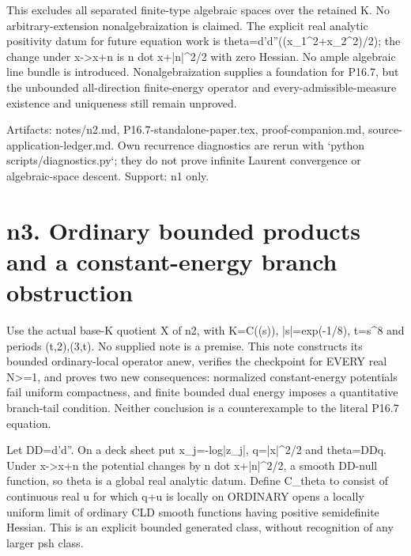 \documentclass[11pt]{article}
\begin{document}
This excludes all separated finite-type algebraic spaces over the retained K. No arbitrary-extension nonalgebraization is claimed. The explicit real analytic positivity datum for future equation work is theta=d'd''((x\_1\textasciicircum{}2+x\_2\textasciicircum{}2)/2); the change under x->x+n is n dot x+|n|\textasciicircum{}2/2 with zero Hessian. No ample algebraic line bundle is introduced. Nonalgebraization supplies a foundation for P16.7, but the unbounded all-direction finite-energy operator and every-admissible-measure existence and uniqueness still remain unproved.

Artifacts: notes/n2.md, P16.7-standalone-paper.tex, proof-companion.md, source-application-ledger.md. Own recurrence diagnostics are rerun with `python scripts/diagnostics.py`; they do not prove infinite Laurent convergence or algebraic-space descent. Support: n1 only.


\section{n3. Ordinary bounded products and a constant-energy branch obstruction}

Use the actual base-K quotient X of n2, with K=C((s)), |s|=exp(-1/8), t=s\textasciicircum{}8 and periods (t,2),(3,t). No supplied note is a premise. This note constructs its bounded ordinary-local operator anew, verifies the checkpoint for EVERY real N>=1, and proves two new consequences: normalized constant-energy potentials fail uniform compactness, and finite bounded dual energy imposes a quantitative branch-tail condition. Neither conclusion is a counterexample to the literal P16.7 equation.

Let DD=d'd''. On a deck sheet put x\_j=-log|z\_j|, q=|x|\textasciicircum{}2/2 and theta=DDq. Under x->x+n the potential changes by n dot x+|n|\textasciicircum{}2/2, a smooth DD-null function, so theta is a global real analytic datum. Define C\_theta to consist of continuous real u for which q+u is locally on ORDINARY opens a locally uniform limit of ordinary CLD smooth functions having positive semidefinite Hessian. This is an explicit bounded generated class, without recognition of any larger psh class.
\end{document}
